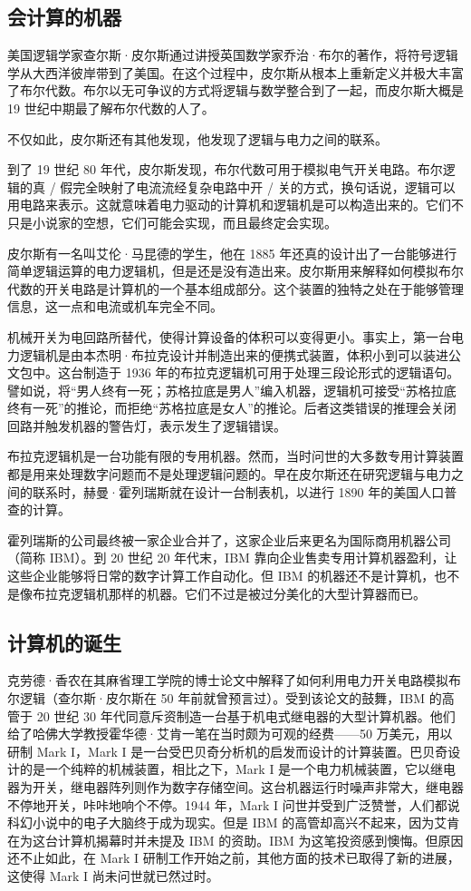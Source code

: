 \documentclass[12pt,UTF8]{ctexbook}
\begin{document}
\subsection{会计算的机器}

美国逻辑学家查尔斯·皮尔斯通过讲授英国数学家乔治·布尔的著作，将符号逻辑学从大西洋彼岸带到了美国。在这个过程中，皮尔斯从根本上重新定义并极大丰富了布尔代数。布尔以无可争议的方式将逻辑与数学整合到了一起，而皮尔斯大概是 19 世纪中期最了解布尔代数的人了。

不仅如此，皮尔斯还有其他发现，他发现了逻辑与电力之间的联系。

到了 19 世纪 80 年代，皮尔斯发现，布尔代数可用于模拟电气开关电路。布尔逻辑的真 / 假完全映射了电流流经复杂电路中开 / 关的方式，换句话说，逻辑可以用电路来表示。这就意味着电力驱动的计算机和逻辑机是可以构造出来的。它们不只是小说家的空想，它们可能会实现，而且最终定会实现。

皮尔斯有一名叫艾伦·马昆德的学生，他在 1885 年还真的设计出了一台能够进行简单逻辑运算的电力逻辑机，但是还是没有造出来。皮尔斯用来解释如何模拟布尔代数的开关电路是计算机的一个基本组成部分。这个装置的独特之处在于能够管理信息，这一点和电流或机车完全不同。

机械开关为电回路所替代，使得计算设备的体积可以变得更小。事实上，第一台电力逻辑机是由本杰明·布拉克设计并制造出来的便携式装置，体积小到可以装进公文包中。这台制造于 1936 年的布拉克逻辑机可用于处理三段论形式的逻辑语句。譬如说，将“男人终有一死；苏格拉底是男人”编入机器，逻辑机可接受“苏格拉底终有一死”的推论，而拒绝“苏格拉底是女人”的推论。后者这类错误的推理会关闭回路并触发机器的警告灯，表示发生了逻辑错误。

布拉克逻辑机是一台功能有限的专用机器。然而，当时问世的大多数专用计算装置都是用来处理数字问题而不是处理逻辑问题的。早在皮尔斯还在研究逻辑与电力之间的联系时，赫曼·霍列瑞斯就在设计一台制表机，以进行 1890 年的美国人口普查的计算。

霍列瑞斯的公司最终被一家企业合并了，这家企业后来更名为国际商用机器公司（简称 IBM）。到 20 世纪 20 年代末，IBM 靠向企业售卖专用计算机器盈利，让这些企业能够将日常的数字计算工作自动化。但 IBM 的机器还不是计算机，也不是像布拉克逻辑机那样的机器。它们不过是被过分美化的大型计算器而已。

\subsection{计算机的诞生}

克劳德·香农在其麻省理工学院的博士论文中解释了如何利用电力开关电路模拟布尔逻辑（查尔斯·皮尔斯在 50 年前就曾预言过）。受到该论文的鼓舞，IBM 的高管于 20 世纪 30 年代同意斥资制造一台基于机电式继电器的大型计算机器。他们给了哈佛大学教授霍华德·艾肯一笔在当时颇为可观的经费——50 万美元，用以研制 Mark I，Mark I 是一台受巴贝奇分析机的启发而设计的计算装置。巴贝奇设计的是一个纯粹的机械装置，相比之下，Mark I 是一个电力机械装置，它以继电器为开关，继电器阵列则作为数字存储空间。这台机器运行时噪声非常大，继电器不停地开关，咔咔地响个不停。1944 年，Mark I 问世并受到广泛赞誉，人们都说科幻小说中的电子大脑终于成为现实。但是 IBM 的高管却高兴不起来，因为艾肯在为这台计算机揭幕时并未提及 IBM 的资助。IBM 为这笔投资感到懊悔。但原因还不止如此，在 Mark I 研制工作开始之前，其他方面的技术已取得了新的进展，这使得 Mark I 尚未问世就已然过时。
\end{document}
